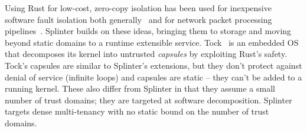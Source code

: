 Using Rust for low-cost, zero-copy isolation has been used for inexpensive
  software fault isolation both generally~\cite{rust-hotos-2016} and for
  network packet processing pipelines~\cite{netbricks-2016}.
Splinter builds on these ideas, bringing them to storage and moving beyond
  static domains to a runtime extensible service.
Tock~\cite{tockos-2017} is an embedded OS that decomposes its kernel into
  untrusted \textsl{capsules} by exploiting Rust's safety. Tock's capsules
  are similar to Splinter's extensions, but they don't protect against denial of
  service (infinite loops) and capsules are static -- they can't be added to a running kernel.
These also differ from Splinter in that they assume a small number of trust
  domains; they are targeted at software decomposition.
Splinter targets dense multi-tenancy with no static
  bound on the number of trust domains.





% 
% 
% 

